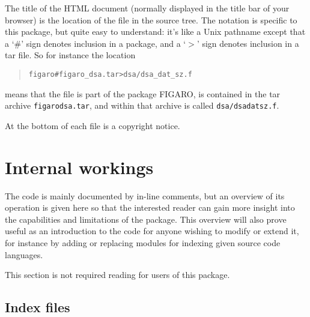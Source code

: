 \documentclass[twoside,11pt]{article}
\newcommand{\latex}[1]{#1}
\renewcommand{\_}{\texttt{\symbol{95}}}
\begin{document}
The title of the HTML document
(normally displayed in the title bar of your browser)
is the location of the file in 
the source tree.  The notation is specific to this package,
but quite easy to understand: 
it's like a Unix pathname except that
a `\#' sign denotes inclusion in a package, 
and a 
`\latex{$}>\latex{$}'
sign denotes inclusion in a tar file.
So for instance the location
\begin{quote}
\begin{verbatim}
figaro#figaro_dsa.tar>dsa/dsa_dat_sz.f
\end{verbatim}
\end{quote}
means that the file is part of the package FIGARO,
is contained in the tar archive {\tt figaro\_dsa.tar}, and
within that archive is called {\tt dsa/dsa\_dat\_sz.f}.

At the bottom of each file is a copyright notice.


\section{Internal workings}

The code is mainly documented by in-line comments,
but an overview of its operation is given here so 
that the interested reader can gain more insight into
the capabilities and limitations of the package.
This overview will also prove useful as an introduction to
the code for anyone wishing to modify or extend it, 
for instance by adding or replacing modules for indexing 
given source code languages.

This section is not required reading for users of this package.

\subsection{Index files}
\end{document}
